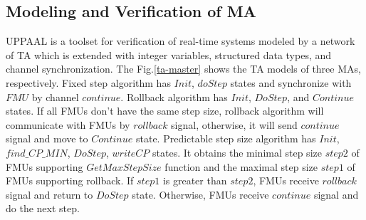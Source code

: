 \subsection{Modeling and Verification of MA} 
UPPAAL is a toolset for verification of real-time systems modeled by a network of TA which is extended with integer variables, structured data types, and channel synchronization. The Fig.\ref{ta-master} shows the TA models of three MAs,  respectively. Fixed step algorithm has $Init$, $doStep$ states and synchronize with $FMU$ by channel $continue$. Rollback algorithm has $Init$, $DoStep$, and $Continue$ states. If all FMUs don't have the same step size, rollback algorithm will communicate with FMUs by $rollback$ signal, otherwise, it will send $continue$ signal and move to $Continue$ state. Predictable step size algorithm has $Init$, $find \_ CP \_ MIN$, $DoStep$, $writeCP$ states. It obtains the minimal step size $step2$ of FMUs supporting $GetMaxStepSize$ function and the maximal step size $step1$ of FMUs supporting rollback. If $step1$ is greater than $step2$, FMUs receive $rollback$ signal and return to $DoStep$ state. Otherwise, FMUs receive $continue$ signal and do the next step.  

\begin{figure}[htbp]
\end{figure}

